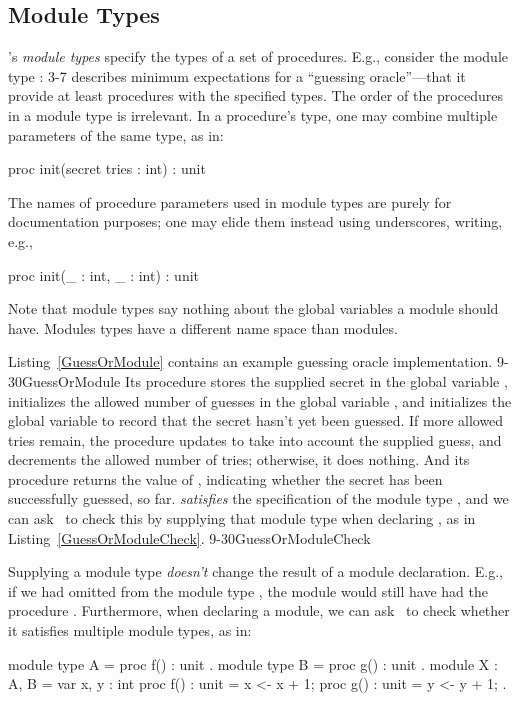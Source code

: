 \subsection{Module Types}

\EasyCrypt's \emph{module types} specify the types of a set of
procedures.  E.g., consider the module type  :
 {3-7}{}  describes
minimum expectations for a ``guessing oracle''---that it provide at
least procedures with the specified types.  The order of the
procedures in a module type is irrelevant. In a procedure's type, one
may combine multiple parameters of the same type, as in:
\begin{easycrypt}{}{}
proc init(secret tries : int) : unit
\end{easycrypt}
The names of procedure parameters used in module types
are purely for documentation purposes; one may elide them instead
using underscores, writing, e.g.,
\begin{easycrypt}{}{}
proc init(_ : int, _ : int) : unit
\end{easycrypt}
Note that module types say nothing about the global variables a module
should have. Modules types have a different name space than modules.

Listing~\ref{GuessOrModule} contains an example guessing oracle
implementation.   {9-30}{GuessOrModule} Its  procedure stores
the supplied secret in the global variable , initializes the
allowed number of guesses in the global variable , and
initializes the  global variable to record that the secret
hasn't yet been guessed.  If more allowed tries remain, the 
procedure updates  to take into account the supplied
guess, and decrements the allowed number of tries; otherwise, it does
nothing.  And its  procedure returns the value of
, indicating whether the secret has been successfully
guessed, so far.
 \emph{satisfies} the specification of the
module type , and we can ask \EasyCrypt\ to check this by
supplying that module type when declaring , as in
Listing~\ref{GuessOrModuleCheck}.
 {9-30}{GuessOrModuleCheck}

Supplying a module type \emph{doesn't} change the result of a module
declaration. E.g., if we had omitted  from the module type
, the module  would still have had the procedure
. Furthermore, when declaring a module, we can ask
\EasyCrypt\ to check whether it satisfies multiple module types, as
in:
\begin{easycrypt}{}{}
module type A = { proc f() : unit }.
module type B = { proc g() : unit }.
module X : A, B = {
  var x, y : int
  proc f() : unit = { x <- x + 1; }
  proc g() : unit = { y <- y + 1; }
}.
\end{easycrypt}

